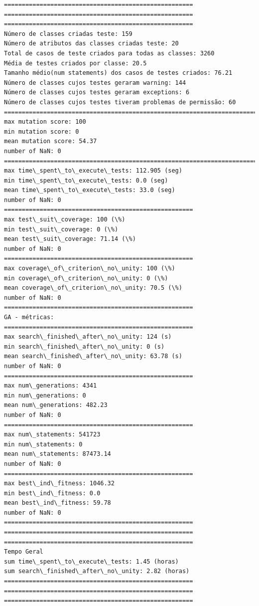 \documentclass[11pt]{article}
\begin{document}
    \begin{Verbatim}[commandchars=\\\{\}]
=====================================================
=====================================================
=====================================================
Número de classes criadas teste: 159
Número de atributos das classes criadas teste: 20
Total de casos de teste criados para todas as classes: 3260
Média de testes criados por classe: 20.5
Tamanho médio(num statements) dos casos de testes criados: 76.21
Número de classes cujos testes geraram warning: 144
Número de classes cujos testes geraram exceptions: 6
Número de classes cujos testes tiveram problemas de permissão: 60
=======================================================================
max mutation score: 100
min mutation score: 0
mean mutation score: 54.37
number of NaN: 0
=======================================================================
max time\_spent\_to\_execute\_tests: 112.905 (seg)
min time\_spent\_to\_execute\_tests: 0.0 (seg)
mean time\_spent\_to\_execute\_tests: 33.0 (seg)
number of NaN: 0
=====================================================
max test\_suit\_coverage: 100 (\%)
min test\_suit\_coverage: 0 (\%)
mean test\_suit\_coverage: 71.14 (\%)
number of NaN: 0
=====================================================
max coverage\_of\_criterion\_no\_unity: 100 (\%)
min coverage\_of\_criterion\_no\_unity: 0 (\%)
mean coverage\_of\_criterion\_no\_unity: 70.5 (\%)
number of NaN: 0
=====================================================
GA - métricas:
=====================================================
max search\_finished\_after\_no\_unity: 124 (s)
min search\_finished\_after\_no\_unity: 0 (s)
mean search\_finished\_after\_no\_unity: 63.78 (s)
number of NaN: 0
=====================================================
max num\_generations: 4341
min num\_generations: 0
mean num\_generations: 482.23
number of NaN: 0
=====================================================
max num\_statements: 541723
min num\_statements: 0
mean num\_statements: 87473.14
number of NaN: 0
=====================================================
max best\_ind\_fitness: 1046.32
min best\_ind\_fitness: 0.0
mean best\_ind\_fitness: 59.78
number of NaN: 0
=====================================================
=====================================================
=====================================================
Tempo Geral
sum time\_spent\_to\_execute\_tests: 1.45 (horas)
sum search\_finished\_after\_no\_unity: 2.82 (horas)
=====================================================
=====================================================
=====================================================

    \end{Verbatim}
\end{document}
